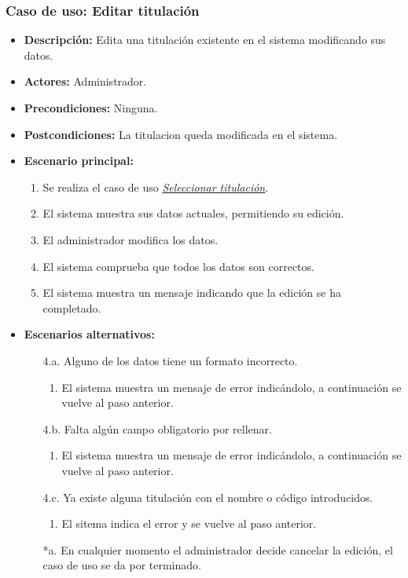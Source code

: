 \documentclass{book}
\begin{document}
\subsubsection*{Caso de uso: Editar titulación}
\begin{itemize}
\item{\bf Descripción:} Edita una titulación existente en el sistema modificando sus datos.
\item{\bf Actores:} Administrador.
\item{\bf Precondiciones:} Ninguna.
\item{\bf Postcondiciones:} La titulacion queda modificada en el sistema.
\item{\bf Escenario principal:}
\begin{enumerate}
	\item Se realiza el caso de uso {\em\hyperref[select_titulacion]{Seleccionar titulación}}.
	\item El sistema muestra sus datos actuales, permitiendo su edición.
	\item El administrador modifica los datos.
	\item El sistema comprueba que todos los datos son correctos.
	\item El sistema muestra un mensaje indicando que la edición se ha completado.
\end{enumerate}
\item{\bf Escenarios alternativos:}
	\begin{itemize}
	\item[4.a.] Alguno de los datos tiene un formato incorrecto.
		\begin{enumerate}
		\item El sistema muestra un mensaje de error indicándolo, a continuación se vuelve al paso anterior.
		\end{enumerate}
	\item[4.b.] Falta algún campo obligatorio por rellenar.
		\begin{enumerate}
		\item El sistema muestra un mensaje de error indicándolo, a continuación se vuelve al paso anterior.
		\end{enumerate}
	\item[4.c.] Ya existe alguna titulación con el nombre o código introducidos.
		\begin{enumerate}
		\item El sitema indica el error y se vuelve al paso anterior.
		\end{enumerate}
	\item[*a.] En cualquier momento el administrador decide cancelar la edición, el caso de uso se da por terminado.
	\end{itemize}
\end{itemize}
\end{document}
